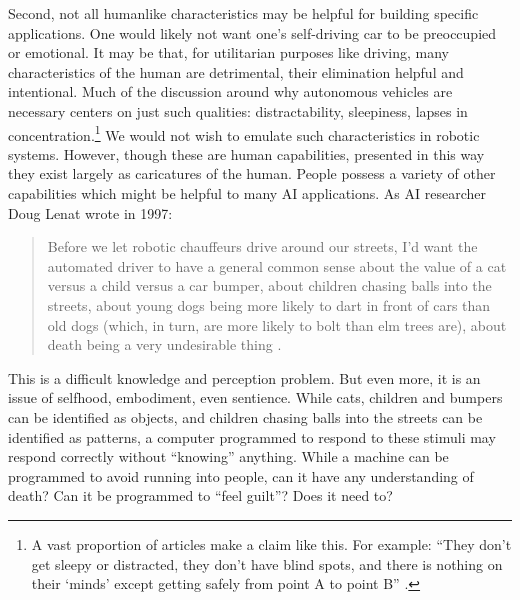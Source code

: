 Second, not all humanlike characteristics may be helpful for building
specific applications. One would likely not want one's self-driving car
to be preoccupied or emotional. It may be
that, for utilitarian 
purposes like driving, many characteristics of the human are
detrimental, their elimination helpful and intentional. Much of the
discussion around why autonomous vehicles are necessary centers on
just such qualities: distractability, sleepiness, lapses in
concentration.\footnote{A vast proportion of articles make a claim
  like this. For example: ``They don't get sleepy or
  distracted, they don't have blind spots, and there is nothing on
  their `minds' except getting safely from point A to point B'' \cite{merrill}.} We
would not wish to emulate such 
characteristics in robotic systems. However, though these are human
capabilities, presented in this way they exist largely as caricatures
of the human. People possess a
variety of other capabilities which might be helpful to many AI
applications. As AI researcher Doug Lenat wrote in 1997:
\begin{quote}
Before we let robotic chauffeurs drive around our streets, I'd want the
  automated driver to have a general common sense about the value of a
cat versus a child versus a car bumper, about children chasing balls
into the streets, about young dogs being more likely to dart in front
of cars than old dogs (which, in turn, are more likely to bolt than
elm trees are), about death being a very undesirable thing \cite[p.
  122]{ekbia}.\end{quote} 

This is a difficult knowledge and perception problem. But even more,
it is an issue of selfhood, embodiment, even sentience. While cats,
children and bumpers can be identified as objects, and children
chasing balls into the streets can be identified as patterns, a
computer programmed to respond to these stimuli may respond correctly
without ``knowing'' anything. While a machine can be programmed to avoid
running into people, can it have any understanding of death? Can it be
programmed to ``feel guilt''? Does it need to?




